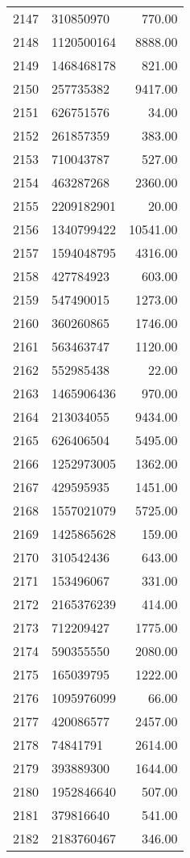 \begin{table}[ht]
\begin{tabular}{rlr}
  2147 & 310850970 & 770.00 \\ 
  2148 & 1120500164 & 8888.00 \\ 
  2149 & 1468468178 & 821.00 \\ 
  2150 & 257735382 & 9417.00 \\ 
  2151 & 626751576 & 34.00 \\ 
  2152 & 261857359 & 383.00 \\ 
  2153 & 710043787 & 527.00 \\ 
  2154 & 463287268 & 2360.00 \\ 
  2155 & 2209182901 & 20.00 \\ 
  2156 & 1340799422 & 10541.00 \\ 
  2157 & 1594048795 & 4316.00 \\ 
  2158 & 427784923 & 603.00 \\ 
  2159 & 547490015 & 1273.00 \\ 
  2160 & 360260865 & 1746.00 \\ 
  2161 & 563463747 & 1120.00 \\ 
  2162 & 552985438 & 22.00 \\ 
  2163 & 1465906436 & 970.00 \\ 
  2164 & 213034055 & 9434.00 \\ 
  2165 & 626406504 & 5495.00 \\ 
  2166 & 1252973005 & 1362.00 \\ 
  2167 & 429595935 & 1451.00 \\ 
  2168 & 1557021079 & 5725.00 \\ 
  2169 & 1425865628 & 159.00 \\ 
  2170 & 310542436 & 643.00 \\ 
  2171 & 153496067 & 331.00 \\ 
  2172 & 2165376239 & 414.00 \\ 
  2173 & 712209427 & 1775.00 \\ 
  2174 & 590355550 & 2080.00 \\ 
  2175 & 165039795 & 1222.00 \\ 
  2176 & 1095976099 & 66.00 \\ 
  2177 & 420086577 & 2457.00 \\ 
  2178 & 74841791 & 2614.00 \\ 
  2179 & 393889300 & 1644.00 \\ 
  2180 & 1952846640 & 507.00 \\ 
  2181 & 379816640 & 541.00 \\ 
  2182 & 2183760467 & 346.00 \\ 

\end{tabular}
\end{table}
